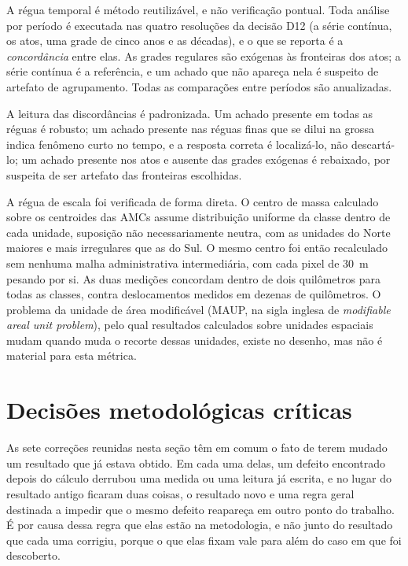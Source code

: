 A régua temporal é método reutilizável, e não verificação pontual. Toda
análise por período é executada nas quatro resoluções da decisão D12 (a
série contínua, os atos, uma grade de cinco anos e as décadas), e o que se
reporta é a \emph{concordância} entre elas. As grades regulares são exógenas
às fronteiras dos atos; a série contínua é a referência, e um achado que não
apareça nela é suspeito de artefato de agrupamento. Todas as comparações
entre períodos são anualizadas.

A leitura das discordâncias é padronizada. Um achado presente em todas as
réguas é robusto; um achado presente nas réguas finas que se dilui na grossa
indica fenômeno curto no tempo, e a resposta correta é localizá-lo, não
descartá-lo; um achado presente nos atos e ausente das grades exógenas é
rebaixado, por suspeita de ser artefato das fronteiras escolhidas.

A régua de escala foi verificada de forma direta. O centro de massa calculado
sobre os centroides das AMCs assume distribuição uniforme da classe dentro de
cada unidade, suposição não necessariamente neutra, com as unidades do Norte
maiores e mais irregulares que as do Sul. O mesmo centro foi então recalculado
sem nenhuma malha administrativa intermediária, com cada pixel de 30~m pesando
por si. As duas medições concordam dentro de dois quilômetros para todas as
classes, contra deslocamentos medidos em dezenas de quilômetros. O problema da
unidade de área modificável (MAUP, na sigla inglesa de \emph{modifiable areal
unit problem}), pelo qual resultados calculados sobre unidades espaciais mudam
quando muda o recorte dessas unidades, existe no desenho, mas não é material
para esta métrica.

\section{Decisões metodológicas críticas}
\label{sec:met-decisoes}

As sete correções reunidas nesta seção têm em comum o fato de terem mudado um
resultado que já estava obtido. Em cada uma delas, um defeito encontrado
depois do cálculo derrubou uma medida ou uma leitura já escrita, e no lugar do
resultado antigo ficaram duas coisas, o resultado novo e uma regra geral
destinada a impedir que o mesmo defeito reapareça em outro ponto do trabalho.
É por causa dessa regra que elas estão na metodologia, e não junto do
resultado que cada uma corrigiu, porque o que elas fixam vale para além do
caso em que foi descoberto.

